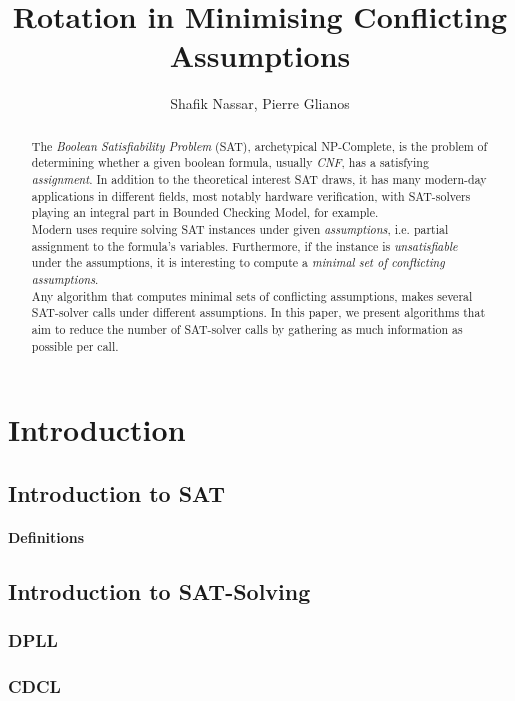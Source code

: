 \documentclass[]{article}
\title{Rotation in Minimising Conflicting Assumptions}
\author{Shafik Nassar, Pierre Glianos}
\begin{document}
\maketitle

\begin{abstract}

The \textit{Boolean Satisfiability Problem} (SAT), archetypical NP-Complete, is the problem of determining whether a given boolean formula, usually \textit{CNF}, has a satisfying \textit{assignment}. In addition to the theoretical interest SAT draws, it has many modern-day applications in different fields, most notably hardware verification, with SAT-solvers playing an integral part in Bounded Checking Model, for example.\\
Modern uses require solving SAT instances under given \textit{assumptions}, i.e. partial assignment to the formula's variables. Furthermore, if the instance is \textit{unsatisfiable} under the assumptions, it is interesting to compute a \textit{minimal set of conflicting assumptions}.\\
Any algorithm that computes minimal sets of conflicting assumptions, makes several SAT-solver calls under different assumptions. In this paper, we present algorithms that aim to reduce the number of SAT-solver calls by gathering as much information as possible per call.

\end{abstract}

\pagebreak
\tableofcontents
\pagebreak

\section{Introduction}
\subsection{Introduction to SAT}
\paragraph{Definitions}
\subsection{Introduction to SAT-Solving}
\subsubsection{DPLL}
\subsubsection{CDCL}
\end{document}
